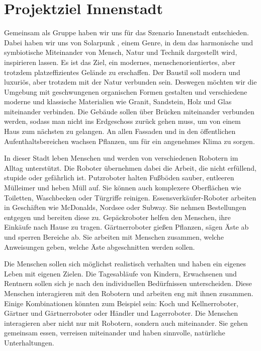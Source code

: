 
\section{Projektziel Innenstadt}

Gemeinsam als Gruppe haben wir uns für das Szenario Innenstadt entschieden. Dabei haben wir uns von Solarpunk \cite{Solarpunk}, einem Genre, in dem das harmonische und symbiotische Miteinander von Mensch, Natur und Technik dargestellt wird, inspirieren lassen. Es ist das Ziel, ein modernes, menschenorientiertes, aber trotzdem platzeffizientes Gelände zu erschaffen. Der Baustil soll modern und luxuriös, aber trotzdem mit der Natur verbunden sein. Deswegen möchten wir die Umgebung mit geschwungenen organischen Formen gestalten und verschiedene moderne und klassische Materialien wie Granit, Sandstein, Holz und Glas miteinander verbinden. Die Gebäude sollen über Brücken miteinander verbunden werden, sodass man nicht ins Erdgeschoss zurück gehen muss, um von einem Haus zum nächsten zu gelangen. An allen Fassaden und in den öffentlichen Aufenthaltsbereichen wachsen Pflanzen, um für ein angenehmes Klima zu sorgen.

In dieser Stadt leben Menschen und werden von verschiedenen Robotern im Alltag unterstützt. Die Roboter übernehmen dabei die Arbeit, die nicht erfüllend, stupide oder gefährlich ist. Putzroboter halten Fußböden sauber, entleeren Mülleimer und heben Müll auf. Sie können auch komplexere Oberflächen wie Toiletten, Waschbecken oder Türgriffe reinigen. Essensverkäufer-Roboter arbeiten in Geschäften wie McDonalds, Nordsee oder Subway. Sie nehmen Bestellungen entgegen und bereiten diese zu. Gepäckroboter helfen den Menschen, ihre Einkäufe nach Hause zu tragen. Gärtnerroboter gießen Pflanzen, sägen Äste ab und sperren Bereiche ab. Sie arbeiten mit Menschen zusammen, welche Anweisungen geben, welche Äste abgeschnitten werden sollen. 

Die Menschen sollen sich möglichst realistisch verhalten und haben ein eigenes Leben mit eigenen Zielen. Die Tagesabläufe von Kindern, Erwachsenen und Rentnern sollen sich je nach den individuellen Bedürfnissen unterscheiden. Diese Menschen interagieren mit den Robotern und arbeiten eng mit ihnen zusammen. Einige Kombinationen könnten zum Beispiel sein: Koch und Kellnerroboter, Gärtner und Gärtnerroboter oder Händler und Lagerroboter. Die Menschen interagieren aber nicht nur mit Robotern, sondern auch miteinander. Sie gehen gemeinsam essen, verreisen miteinander und haben sinnvolle, natürliche Unterhaltungen.

